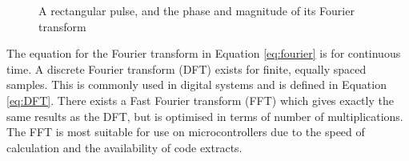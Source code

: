 \begin{figure}
\centering
{}
\caption{A rectangular pulse, and the phase and magnitude of its Fourier transform}
\label{fig:SquareWaveFT}
\end{figure}

The equation for the Fourier transform in Equation \eqref{eq:fourier} is for continuous time. A discrete Fourier transform (DFT) exists for finite, equally spaced samples. This is commonly used in digital systems and is defined in Equation \eqref{eq:DFT}. There exists a Fast Fourier transform (FFT) which gives exactly the same results as the DFT, but is optimised in terms of number of multiplications. The FFT is most suitable for use on microcontrollers due to the speed of calculation and the availability of code extracts. %

